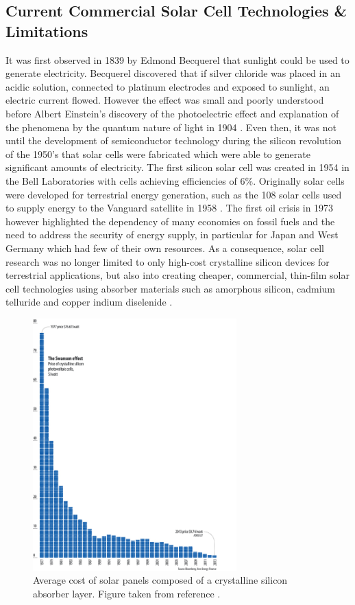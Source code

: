 \subsection{Current Commercial Solar Cell Technologies \& Limitations}\label{current_tech}
It was first observed in 1839 by Edmond Becquerel that sunlight could be used to generate electricity. Becquerel discovered that if  silver chloride was placed in an acidic solution, connected to platinum electrodes and exposed to sunlight, an electric current flowed. However the effect was small and poorly understood before Albert Einstein's discovery of the photoelectric effect and explanation of the phenomena by the quantum nature of light in 1904 \cite{PV_history1}. Even then, it was not until the development of semiconductor technology during the silicon revolution of the 1950's that solar cells were fabricated which were able to generate significant amounts of electricity. The first silicon solar cell was created in 1954 in the Bell Laboratories with cells achieving efficiencies of 6\%. 
Originally solar cells were developed for terrestrial energy generation, such as the 108 solar cells used to supply energy to the Vanguard satellite in 1958 \cite{PV_history1}. The first oil crisis in 1973 however highlighted the dependency of many economies on fossil fuels and the need to address the security of energy supply,  in particular for Japan and West Germany which had few of their own resources. As a consequence, solar cell research was no longer limited to only high-cost crystalline silicon devices for terrestrial applications, but also into creating cheaper, commercial, thin-film solar cell technologies using absorber materials such as amorphous silicon, cadmium telluride and copper indium diselenide  \cite{PV_history2}.\\

\begin{figure}[h!]
  \centering
    \includegraphics[width=0.7\textwidth]{figures/Si_cost.jpg}
    \caption{Average cost of solar panels composed of a crystalline silicon absorber layer. Figure taken from reference .}
  \label{Si_cost}
\end{figure}

